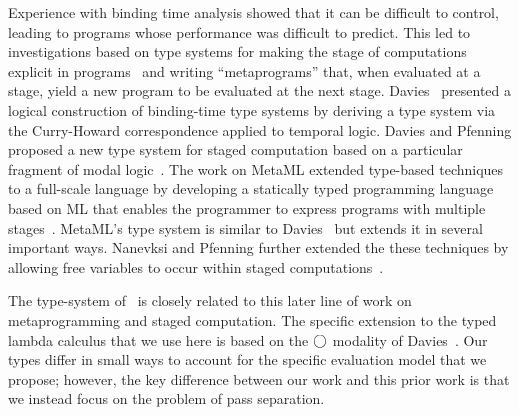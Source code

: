 Experience with binding time analysis showed that it can be difficult
to control, leading to programs whose performance was difficult to
predict. This led to investigations based on type systems for making
the stage of computations explicit in programs~\cite{GJ91-lambda,NN92-twolevel}
and writing ``metaprograms'' that, when evaluated at a stage, yield
a new program to be evaluated at the next stage.
Davies~\cite{davies96} presented a
logical construction of binding-time type systems by deriving a type
system via the Curry-Howard correspondence applied to temporal logic.
Davies and Pfenning proposed a new type system for staged computation
based on a particular fragment of modal logic~\cite{DP01-modal}. The
work on MetaML extended type-based techniques to a full-scale language
by developing a statically typed programming language based on ML that
enables the programmer to express programs with multiple
stages~\cite{Taha97,taha-thesis-99}.  MetaML's type system is similar
to Davies~\cite{davies96} but extends it in several important ways.
Nanevksi and Pfenning further extended the these techniques by
allowing free variables to occur within staged
computations~\cite{NP05-nn}.

The type-system of \lang\ is closely related to this later line of
work on metaprogramming and staged computation.  The specific
extension to the typed lambda calculus that we use here is based on
the $\bigcirc$ modality of Davies~\cite{DP01-modal}.  Our types differ in
small ways to account for the specific evaluation model that we
propose; however, the key difference between our work and this prior work is
that we instead focus on the problem of pass separation.
%


